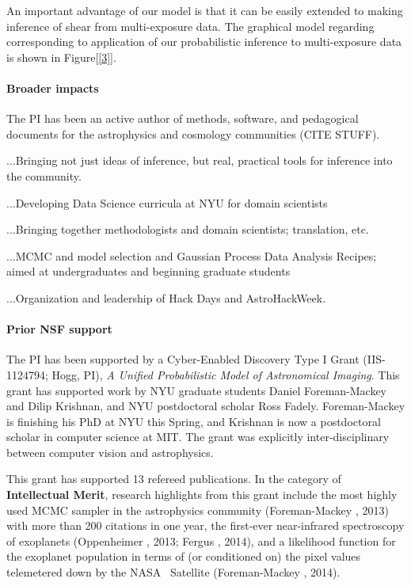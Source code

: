 \documentclass[12pt]{article}
\begin{document}
An important advantage of our model is that it can be easily extended
to making inference of shear from multi-exposure data. The graphical model 
regarding corresponding to application of our probabilistic inference to
multi-exposure data is shown in Figure[\ref{3}].

\paragraph{Broader impacts}

The PI has been an active author of methods, software, and pedagogical
documents for the astrophysics and cosmology communities (CITE STUFF).

...Bringing not just ideas of inference, but real, practical tools for inference into the community.

...Developing Data Science curricula at NYU for domain scientists

...Bringing together methodologists and domain scientists; translation, etc.

...MCMC and model selection and Gaussian Process Data Analysis Recipes; aimed at undergraduates and beginning graduate students

...Organization and leadership of Hack Days and AstroHackWeek.

\paragraph{Prior NSF support}

The PI has been supported by a Cyber-Enabled Discovery Type I Grant
(IIS-1124794; Hogg, PI), \textit{A Unified Probabilistic Model of
  Astronomical Imaging}.
This grant has supported work by NYU graduate students Daniel
Foreman-Mackey and Dilip Krishnan, and NYU postdoctoral scholar Ross
Fadely.
Foreman-Mackey is finishing his PhD at NYU this Spring, and Krishnan
is now a postdoctoral scholar in computer science at MIT.
The grant was explicitly inter-disciplinary between computer vision
and astrophysics.

This grant has supported 13 refereed publications.
In the category of \textbf{Intellectual Merit},
research highlights from this grant include the most highly used MCMC
sampler in the astrophysics community (Foreman-Mackey \etal, 2013)
with more than 200 citations in one year, the
first-ever near-infrared spectroscopy of exoplanets (Oppenheimer \etal, 2013;
Fergus \etal, 2014), and a likelihood function for the exoplanet population
in terms of (or conditioned on) the pixel values telemetered down by
the NASA \kepler\ Satellite (Foreman-Mackey \etal, 2014).
\end{document}
